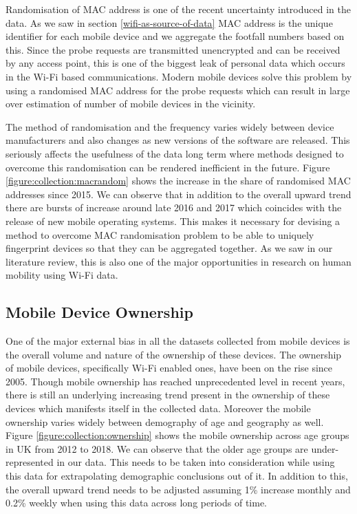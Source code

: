 Randomisation of MAC address is one of the recent uncertainty introduced in the data.
As we saw in section \ref{wifi-as-source-of-data} MAC address is the unique identifier for each mobile device and we aggregate the footfall numbers based on this.
Since the probe requests are transmitted unencrypted and can be received by any access point, this is one of the biggest leak of personal data which occurs in the Wi-Fi based communications.
Modern mobile devices solve this problem by using a randomised MAC address for the probe requests which can result in large over estimation of number of mobile devices in the vicinity.

The method of randomisation and the frequency varies widely between device manufacturers and also changes as new versions of the software are released.
This seriously affects the usefulness of the data long term where methods designed to overcome this randomisation can be rendered inefficient in the future.
Figure \ref{figure:collection:macrandom} shows the increase in the share of randomised MAC addresses since 2015.
We can observe that in addition to the overall upward trend there are bursts of increase around late 2016 and 2017 which coincides with the release of new mobile operating systems.
This makes it necessary for devising a method to overcome MAC randomisation problem to be able to uniquely fingerprint devices so that they can be aggregated together.
As we saw in our literature review, this is also one of the major opportunities in research on human mobility using Wi-Fi data.

\subsection{Mobile Device Ownership}
One of the major external bias in all the datasets collected from mobile devices is the overall volume and nature of the ownership of these devices.
The ownership of mobile devices, specifically Wi-Fi enabled ones, have been on the rise since 2005.
Though mobile ownership has reached unprecedented level in recent years, there is still an underlying increasing trend present in the ownership of these devices which manifests itself in the collected data.
Moreover the mobile ownership varies widely between demography of age and geography as well. 
Figure \ref{figure:collection:ownership} shows the mobile ownership across age groups in UK from 2012 to 2018.
We can observe that the older age groups are under-represented in our data.
This needs to be taken into consideration while using this data for extrapolating demographic conclusions out of it.
In addition to this, the overall upward trend needs to be adjusted assuming 1\% increase monthly and 0.2\% weekly when using this data across long periods of time.

